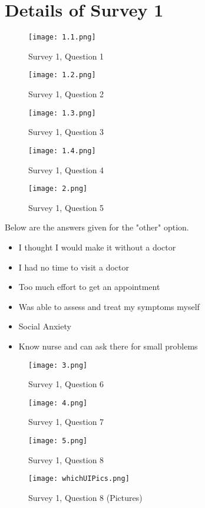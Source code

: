 
\clearpage
\appendix
{} 

\chapter{Details of Survey 1}
\begin{center}
\begin{figure}[H]
	\centering
	\texttt{[image: 1.1.png]}
	\caption{Survey 1, Question 1}
\end{figure}
\begin{figure}[H]
	\centering
	\texttt{[image: 1.2.png]}
		\caption{Survey 1, Question 2}
\end{figure}
\begin{figure}[H]
	\centering
	\texttt{[image: 1.3.png]}
	\caption{Survey 1, Question 3}
\end{figure}
\begin{figure}[H]
	\centering
	\texttt{[image: 1.4.png]}
	\caption{Survey 1, Question 4}
\end{figure}
\begin{figure}[H]
	\centering
	\texttt{[image: 2.png]}
	\caption{Survey 1, Question 5}
\end{figure}
Below are the answers given for the "other" option.
\begin{itemize}
	\item I thought I would make it without a doctor
	\item I had no time to visit a doctor
	\item Too much effort to get an appointment
	\item Was able to assess and treat my symptoms myself
	\item Social Anxiety
	\item Know nurse and can ask there for small problems
\end{itemize}
\begin{figure}[H]
	\centering
	\texttt{[image: 3.png]}
	\caption{Survey 1, Question 6}
\end{figure}
\begin{figure}[H]
	\centering
	\texttt{[image: 4.png]}
	\caption{Survey 1, Question 7}
\end{figure}
\begin{figure}[H]
	\centering
	\texttt{[image: 5.png]}
	\caption{Survey 1, Question 8}
\end{figure}
\begin{figure}[H]
\centering
\texttt{[image: whichUIPics.png]}
	\caption{Survey 1, Question 8 (Pictures)}
\end{figure}
\end{center}
\pagebreak


